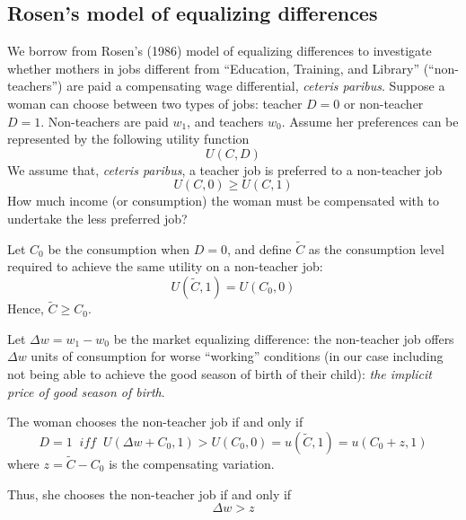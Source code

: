 \documentclass[a4paper, 12 pt]{article}
\theoremstyle{plain}
\begin{document}
\begin{doublespace}
\subsection{Rosen's model of equalizing differences}
We borrow from Rosen's (1986) model of equalizing differences to investigate whether mothers in jobs different from ``Education, Training, and Library'' (``non-teachers'') are paid a compensating wage differential, \emph{ceteris paribus}. Suppose a woman can choose between two types of jobs: teacher $D=0$ or non-teacher $D=1$. Non-teachers are paid $w_1$, and teachers $w_0$.
Assume her preferences can be represented by the following utility function
\begin{equation*}
U(C,D)
\end{equation*}
We assume that, \emph{ceteris paribus}, a teacher job is preferred to a non-teacher job
\begin{equation*}
U(C,0) \geq U(C,1)
\end{equation*}
How much income (or consumption) the woman must be compensated with to undertake the less preferred job?

Let $C_0$ be the consumption when $D=0$, and define $\widetilde{C}$ as the consumption level required to achieve the same utility on a non-teacher job:
\begin{equation*}
U(\widetilde{C},1) = U(C_0,0)
\end{equation*}
Hence, $\widetilde{C} \geq C_0$.

Let $\Delta w = w_1 - w_0$ be the market equalizing difference: the non-teacher job offers $\Delta w$ units of consumption for worse ``working'' conditions (in our case including not being able to achieve the good season of birth of their child): \emph{the implicit price of good season of birth}.

The woman chooses the non-teacher job if and only if
\begin{equation*}
D = 1\;\;iff\;\;U(\Delta w + C_0,1)>U(C_0,0)=u(\widetilde{C},1)=u(C_0 + z, 1)
\end{equation*}
where $z = \widetilde{C} - C_0$ is the compensating variation.

Thus, she chooses the non-teacher job if and only if
\begin{equation*}
\Delta w > z
\end{equation*}


\end{doublespace}
\end{document}
